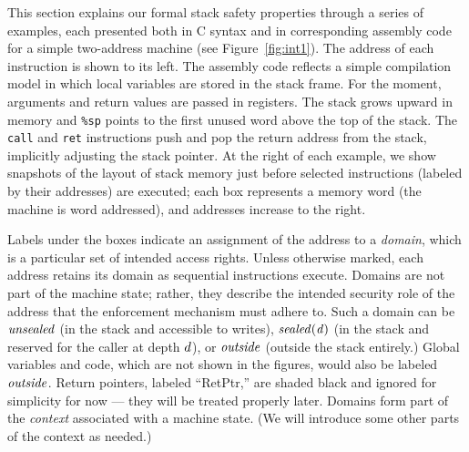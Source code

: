 \documentclass[acmsmall,review,anonymous]{acmart}\settopmatter{printfolios=true,printccs=false,printacmref=false}
\begin{document}
This section explains our formal stack safety properties through a series
of examples, each presented both in C syntax and in corresponding assembly code for a
simple two-address machine (see Figure~\ref{fig:int1}).
The address of each instruction is shown to its left.
The assembly code reflects a simple compilation model in which
local variables are stored in the stack frame.
For the moment, arguments and return values are passed in registers.
The stack grows upward in
memory and {\tt \%sp} points to the first unused word above the top of the stack.
The {\tt call} and {\tt ret} instructions push and pop the return address from the stack,
implicitly adjusting the stack pointer.
At the right of each example, we show snapshots of the layout of stack memory just before
selected instructions (labeled by their addresses) are executed; each box represents a memory word
(the machine is word addressed), and addresses increase to the right.

Labels under the boxes indicate an assignment of the address to a
{\em domain}, which is a particular set of intended access
rights. Unless otherwise marked, each address retains its domain as
sequential instructions execute. %
Domains are not part of the machine state; rather, they
describe the intended security role of the address
that the enforcement mechanism must adhere to. Such a domain
can be \(\mathit{unsealed}\) (in the stack and accessible to writes), \(\mathit{sealed(d)}\)
(in the stack and reserved for the caller at depth \(d\)), or \(\mathit{outside}\)
(outside the stack entirely.)
Global variables and code, which are not shown in the figures, would
also be labeled \(\mathit{outside}\). Return pointers, labeled ``RetPtr,''
are shaded black and ignored for simplicity for now --- they will
be treated properly later.
Domains form part of the {\em context} associated with a machine state.
(We will introduce some other parts of the context as needed.)
\end{document}
